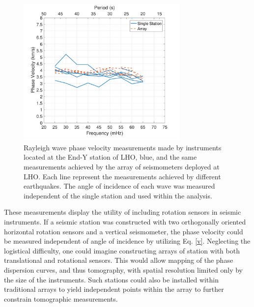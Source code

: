 \documentclass [12pt, proquest]{uwthesis}[2019]
\begin{document}
\begin{figure}%
\begin{center}
\includegraphics[width=0.75\textwidth]{Vel.pdf}
\caption{Rayleigh wave phase velocity measurements made by instruments located at the End-Y station of LHO, blue, and the same measurements achieved by the array of seismometers deployed at LHO. Each line represent the measurements achieved by different earthquakes. The angle of incidence of each wave was measured independent of the single station and used within the analysis. \cite{tiltSeismology}}
\label{Phase_Hanford}
\end{center}
\end{figure}

These measurements display the utility of including rotation sensors in seismic instruments. If a seismic station was constructed with two orthogonally oriented horizontal rotation sensors and a vertical seismometer, the phase velocity could be measured independent of angle of incidence by utilizing Eq. \ref{v}. Neglecting the logistical difficulty, one could imagine constructing arrays of station with both translational and rotational sensors. This would allow mapping of the phase dispersion curves, and thus tomography, with spatial resolution limited only by the size of the instruments. Such stations could also be installed within traditional arrays to yield independent points within the array to further constrain tomographic measurements.

%
\end{document}
